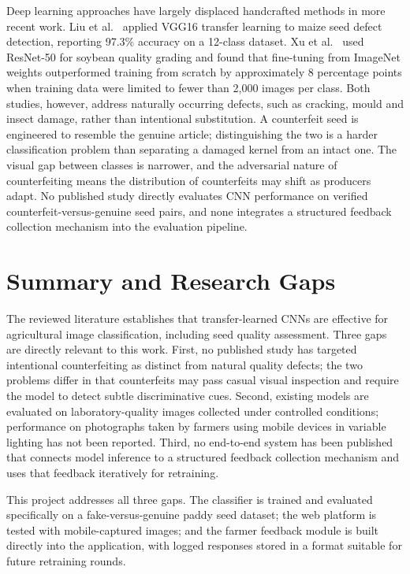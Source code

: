 Deep learning approaches have largely displaced handcrafted methods in more recent work. Liu et al.~\cite{liu2020} applied VGG16 transfer learning to maize seed defect detection, reporting 97.3\% accuracy on a 12-class dataset. Xu et al.~\cite{xu2021} used ResNet-50 for soybean quality grading and found that fine-tuning from ImageNet weights outperformed training from scratch by approximately 8 percentage points when training data were limited to fewer than 2{,}000 images per class. Both studies, however, address naturally occurring defects, such as cracking, mould and insect damage, rather than intentional substitution. A counterfeit seed is engineered to resemble the genuine article; distinguishing the two is a harder classification problem than separating a damaged kernel from an intact one. The visual gap between classes is narrower, and the adversarial nature of counterfeiting means the distribution of counterfeits may shift as producers adapt. No published study directly evaluates CNN performance on verified counterfeit-versus-genuine seed pairs, and none integrates a structured feedback collection mechanism into the evaluation pipeline.

\section{Summary and Research Gaps}

The reviewed literature establishes that transfer-learned CNNs are effective for agricultural image classification, including seed quality assessment. Three gaps are directly relevant to this work. First, no published study has targeted intentional counterfeiting as distinct from natural quality defects; the two problems differ in that counterfeits may pass casual visual inspection and require the model to detect subtle discriminative cues. Second, existing models are evaluated on laboratory-quality images collected under controlled conditions; performance on photographs taken by farmers using mobile devices in variable lighting has not been reported. Third, no end-to-end system has been published that connects model inference to a structured feedback collection mechanism and uses that feedback iteratively for retraining.

This project addresses all three gaps. The classifier is trained and evaluated specifically on a fake-versus-genuine paddy seed dataset; the web platform is tested with mobile-captured images; and the farmer feedback module is built directly into the application, with logged responses stored in a format suitable for future retraining rounds.